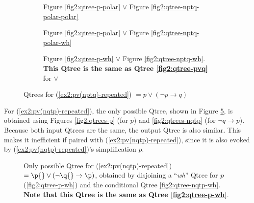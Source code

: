 \begin{figure}[H]
	\centering
	\begin{subfigure}[b]{.3\linewidth}
		\centering
		\caption{Figure \ref{fig2:qtree-p-polar} $\vee$ Figure \ref{fig2:qtree-nptq-polar-polar}}\label{fig2:qtree-pv(nptq)-polar-polar}
	\end{subfigure}\hfill
	\begin{subfigure}[b]{.3\linewidth}
		\centering
		\scalebox{1}{
			\begin{forest}
				[CS [{\fbox{$\p$}}][{$\neg \p$} [\fbox{$\q$}][$\r$][...]]]
			\end{forest}
		}
		\caption{Figure \ref{fig2:qtree-p-polar} $\vee$ Figure \ref{fig2:qtree-nptq-polar-wh}}\label{fig2:qtree-pv(nptq)-polar-wh}
	\end{subfigure}\hfill
	\begin{subfigure}[b]{.33\linewidth}
		\centering
		\scalebox{1}{
			\begin{forest}
				[CS [{\fbox{$\p$}}][\fbox{$\q$}][{$\r$}][...]]
			\end{forest}
		}
		\caption{Figure \ref{fig2:qtree-p-wh} $\vee$ Figure \ref{fig2:qtree-nptq-wh}. \textbf{This Qtree is the same as Qtree \ref{fig2:qtree-pvq}} for \p$\vee$\q}\label{fig2:qtree-pv(nptq)-wh}
	\end{subfigure}
	\caption{Qtrees for (\ref{ex2:pv(nptq)-repeated}) $= p \vee (\neg p \rightarrow q)$}\label{fig2:qtrees-pv(nptq)}
\end{figure}

For (\ref{ex2:pv(nqtp)-repeated}), the only possible Qtree, shown in Figure \ref{fig2:qtree-pv(nqtp)}, is obtained using Figures \ref{fig2:qtrees-p} (for $p$) and \ref{fig2:qtrees-nqtp} (for $\neg q \rightarrow p$). Because both input Qtrees are the same, the output Qtree is also similar. This makes it inefficient if paired with (\ref{ex2:pv(nqtp)-repeated}), since it is also evoked by (\ref{ex2:pv(nqtp)-repeated})'s simplification $p$.


	\begin{figure}[H]
		\centering
		\begin{subfigure}[b]{.22\linewidth}
			\centering
			\scalebox{1}{
				\begin{forest}
					[CS [{\fbox{$\p$}}][{$\q$}][{$\r$}][...]]
				\end{forest}
			}
			
		\end{subfigure}
		\caption{Only possible Qtree for (\ref{ex2:pv(nqtp)-repeated}) $= \p{}  \vee  (\neg \q{} \rightarrow \p)$, obtained by disjoining a ``\textit{wh}'' Qtree for $p$ (\ref{fig2:qtree-p-wh}) and the conditional Qtree \ref{fig2:qtree-nqtp-wh}. \textbf{Note that this Qtree is the same as Qtree \ref{fig2:qtree-p-wh}}.}\label{fig2:qtree-pv(nqtp)}
	\end{figure}
	
